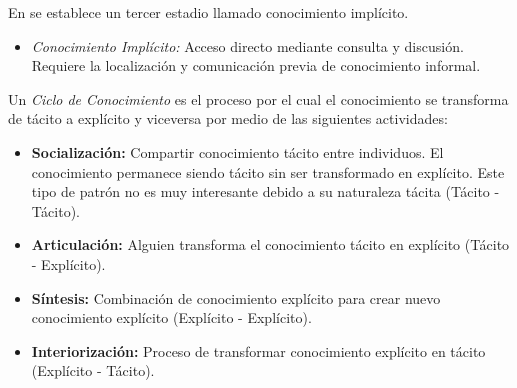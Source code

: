 En \cite{liebowitz1998} se establece un tercer estadio llamado conocimiento implícito.

\begin{itemize}
\item \textit{Conocimiento Implícito:} Acceso directo mediante consulta y discusión. Requiere la localización y comunicación previa de conocimiento informal.
\end{itemize}

Un \textit{Ciclo de Conocimiento} es el proceso por el cual el conocimiento se transforma de tácito a explícito y viceversa por medio de las siguientes actividades:

\begin{itemize}
\item \textbf{Socialización:} Compartir conocimiento tácito entre individuos. El conocimiento permanece siendo tácito sin ser transformado en explícito. Este tipo de patrón no es muy interesante debido a su naturaleza tácita (Tácito - Tácito).

\item \textbf{Articulación:} Alguien transforma el conocimiento tácito en explícito (Tácito - Explícito).

\item \textbf{Síntesis:} Combinación de conocimiento explícito para crear nuevo conocimiento explícito  (Explícito - Explícito).
 
\item \textbf{Interiorización:} Proceso de transformar conocimiento explícito en tácito (Explícito - Tácito).
\end{itemize}


